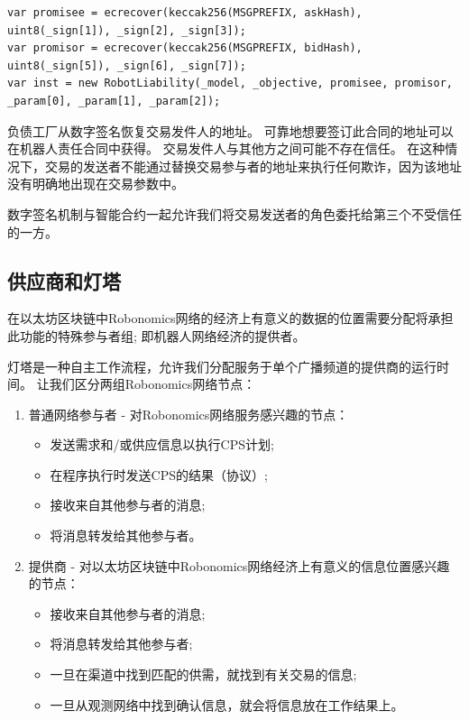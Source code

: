 \documentclass[UTF8]{article}
\begin{document}
\begin{lstlisting}
var promisee = ecrecover(keccak256(MSGPREFIX, askHash), uint8(_sign[1]), _sign[2], _sign[3]);
var promisor = ecrecover(keccak256(MSGPREFIX, bidHash), uint8(_sign[5]), _sign[6], _sign[7]);
var inst = new RobotLiability(_model, _objective, promisee, promisor, _param[0], _param[1], _param[2]);
\end{lstlisting}

负债工厂从数字签名恢复交易发件人的地址。 可靠地想要签订此合同的地址可以在机器人责任合同中获得。 交易发件人与其他方之间可能不存在信任。 在这种情况下，交易的发送者不能通过替换交易参与者的地址来执行任何欺诈，因为该地址没有明确地出现在交易参数中。

数字签名机制与智能合约一起允许我们将交易发送者的角色委托给第三个不受信任的一方。

\subsection{供应商和灯塔}

在以太坊区块链中Robonomics网络的经济上有意义的数据的位置需要分配将承担此功能的特殊参与者组; 即机器人网络经济的提供者。

灯塔是一种自主工作流程，允许我们分配服务于单个广播频道的提供商的运行时间。 让我们区分两组Robonomics网络节点：

\begin{enumerate}
   \item 普通网络参与者 - 对Robonomics网络服务感兴趣的节点：
   \begin{itemize}
     \item 发送需求和/或供应信息以执行CPS计划;
     \item 在程序执行时发送CPS的结果（协议）;
     \item 接收来自其他参与者的消息;
     \item 将消息转发给其他参与者。
   \end{itemize}
   \item 提供商 - 对以太坊区块链中Robonomics网络经济上有意义的信息位置感兴趣的节点：
   \begin{itemize}
     \item 接收来自其他参与者的消息;
     \item 将消息转发给其他参与者;
     \item 一旦在渠道中找到匹配的供需，就找到有关交易的信息;
     \item 一旦从观测网络中找到确认信息，就会将信息放在工作结果上。
   \end{itemize}
\end{enumerate}
\end{document}
